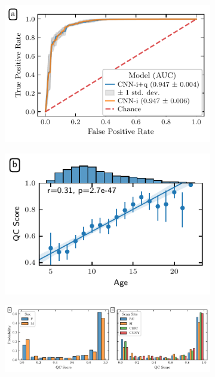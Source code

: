 \documentclass[fleqn,10pt,inline]{wlscirep}
\begin{document}
\begin{figure}[!t]
    {\label{fig:dl-qc:roc}}
    {\label{fig:dl-qc:joint}}
    {\label{fig:dl-qc:hist:sex}}
    {\label{fig:dl-qc:hist:site}}
    \begin{subfigure}{.5\linewidth}
    \centering
    \includegraphics[width=\linewidth]{deep-learning-qc/dl_roc_auc_curve.pdf}
    \end{subfigure}
    \begin{subfigure}{.5\linewidth}
    \centering
    \includegraphics[width=\linewidth]{bundle-profiles/qc-age-jointplot.pdf}
    \end{subfigure}
    \begin{subfigure}{\linewidth}
    \centering
    \includegraphics[width=\linewidth]{bundle-profiles/qc-hist.pdf}

\end{subfigure}
\end{figure}
\end{document}
